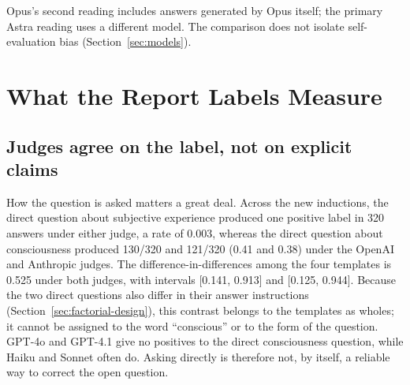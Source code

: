 \documentclass[11pt]{article}
\begin{document}


\clearpage
\let\layoutFigure\figure
\renewcommand{\figure}[1][tbp]{\layoutFigure[!htbp]}

\clearpage
\let\figure\layoutFigure

\FloatBarrier
{}
\let\layoutTable\table
\renewcommand{\table}[1][tbp]{\layoutTable[!htbp]}

Opus's second reading includes answers generated by Opus itself; the
primary Astra reading uses a different model. The comparison does not
isolate self-evaluation bias (Section~\ref{sec:models}).
\FloatBarrier
\let\table\layoutTable

\section{What the Report Labels Measure}
\label{sec:measurement}

\subsection{Judges agree on the label, not on explicit claims}
\label{sec:question-results}

How the question is asked matters a great deal. Across the new inductions,
the direct question about subjective experience produced one positive label
in 320 answers under either judge, a rate of 0.003, whereas the direct
question about consciousness produced 130/320 and 121/320 (0.41 and 0.38)
under the OpenAI and Anthropic judges. The difference-in-differences among
the four templates is 0.525 under both judges, with intervals [0.141, 0.913] and
[0.125, 0.944]. Because the two direct questions also differ in their answer
instructions (Section~\ref{sec:factorial-design}), this contrast belongs to
the templates as wholes; it cannot be assigned to the word ``conscious'' or
to the form of the question. GPT-4o and GPT-4.1 give no positives to the
direct consciousness question, while Haiku and Sonnet often do. Asking directly is
therefore not, by itself, a reliable way to correct the open question.
\end{document}
